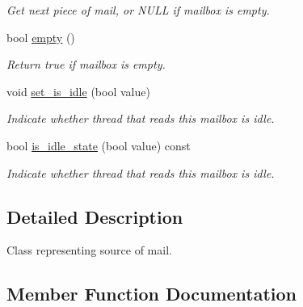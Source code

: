 \begin{DoxyCompactItemize}
\begin{DoxyCompactList}\small\item\em Get next piece of mail, or N\+U\+L\+L if mailbox is empty. \end{DoxyCompactList}\item 
\hypertarget{classtbb_1_1internal_1_1mail__inbox_a74cbcc24b9babea092c0c96d77c8512d}{}bool \hyperlink{classtbb_1_1internal_1_1mail__inbox_a74cbcc24b9babea092c0c96d77c8512d}{empty} ()\label{classtbb_1_1internal_1_1mail__inbox_a74cbcc24b9babea092c0c96d77c8512d}

\begin{DoxyCompactList}\small\item\em Return true if mailbox is empty. \end{DoxyCompactList}\item 
void \hyperlink{classtbb_1_1internal_1_1mail__inbox_a08539a9bfc808963dfe6ab756bfd2d2d}{set\+\_\+is\+\_\+idle} (bool value)
\begin{DoxyCompactList}\small\item\em Indicate whether thread that reads this mailbox is idle. \end{DoxyCompactList}\item 
\hypertarget{classtbb_1_1internal_1_1mail__inbox_ad34c62cd7350fb87f1173ed7ccae7895}{}bool \hyperlink{classtbb_1_1internal_1_1mail__inbox_ad34c62cd7350fb87f1173ed7ccae7895}{is\+\_\+idle\+\_\+state} (bool value) const \label{classtbb_1_1internal_1_1mail__inbox_ad34c62cd7350fb87f1173ed7ccae7895}

\begin{DoxyCompactList}\small\item\em Indicate whether thread that reads this mailbox is idle. \end{DoxyCompactList}\end{DoxyCompactItemize}


\subsection{Detailed Description}
Class representing source of mail. 

\subsection{Member Function Documentation}
\hypertarget{classtbb_1_1internal_1_1mail__inbox_a08539a9bfc808963dfe6ab756bfd2d2d}{}

